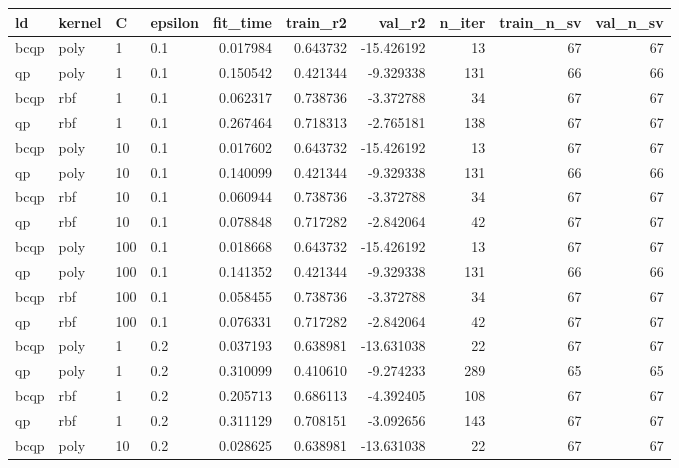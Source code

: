 \begin{tabular}{llllrrrrrr}
\toprule
  ld & kernel &   C & epsilon &  fit\_time &  train\_r2 &     val\_r2 &  n\_iter &  train\_n\_sv &  val\_n\_sv \\
\midrule
bcqp &   poly &   1 &     0.1 &  0.017984 &  0.643732 & -15.426192 &      13 &          67 &        67 \\
  qp &   poly &   1 &     0.1 &  0.150542 &  0.421344 &  -9.329338 &     131 &          66 &        66 \\
bcqp &    rbf &   1 &     0.1 &  0.062317 &  0.738736 &  -3.372788 &      34 &          67 &        67 \\
  qp &    rbf &   1 &     0.1 &  0.267464 &  0.718313 &  -2.765181 &     138 &          67 &        67 \\
bcqp &   poly &  10 &     0.1 &  0.017602 &  0.643732 & -15.426192 &      13 &          67 &        67 \\
  qp &   poly &  10 &     0.1 &  0.140099 &  0.421344 &  -9.329338 &     131 &          66 &        66 \\
bcqp &    rbf &  10 &     0.1 &  0.060944 &  0.738736 &  -3.372788 &      34 &          67 &        67 \\
  qp &    rbf &  10 &     0.1 &  0.078848 &  0.717282 &  -2.842064 &      42 &          67 &        67 \\
bcqp &   poly & 100 &     0.1 &  0.018668 &  0.643732 & -15.426192 &      13 &          67 &        67 \\
  qp &   poly & 100 &     0.1 &  0.141352 &  0.421344 &  -9.329338 &     131 &          66 &        66 \\
bcqp &    rbf & 100 &     0.1 &  0.058455 &  0.738736 &  -3.372788 &      34 &          67 &        67 \\
  qp &    rbf & 100 &     0.1 &  0.076331 &  0.717282 &  -2.842064 &      42 &          67 &        67 \\
bcqp &   poly &   1 &     0.2 &  0.037193 &  0.638981 & -13.631038 &      22 &          67 &        67 \\
  qp &   poly &   1 &     0.2 &  0.310099 &  0.410610 &  -9.274233 &     289 &          65 &        65 \\
bcqp &    rbf &   1 &     0.2 &  0.205713 &  0.686113 &  -4.392405 &     108 &          67 &        67 \\
  qp &    rbf &   1 &     0.2 &  0.311129 &  0.708151 &  -3.092656 &     143 &          67 &        67 \\
bcqp &   poly &  10 &     0.2 &  0.028625 &  0.638981 & -13.631038 &      22 &          67 &        67 \\

\end{tabular}

